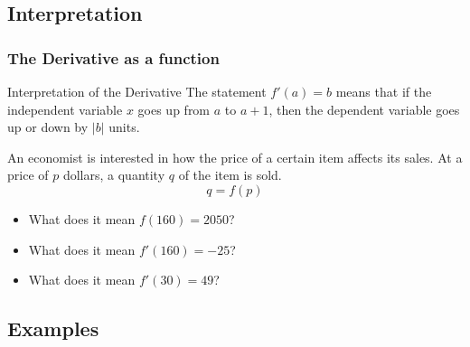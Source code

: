 \documentclass[9pt,xcolor=x11names,compress]{beamer}
\begin{document}
\subsection{Interpretation}
\begin{frame}\frametitle{The Derivative as a function}
\begin{block}{Interpretation of the Derivative}
The statement $f'(a)=b$ means that if the independent variable $x$ goes up from $a$ to $a+1$, then the dependent variable goes up or down by $\lvert b\rvert$ units.
\end{block}
\pause
\begin{example}
	An economist is interested in how the price of a certain item affects its sales.  At a price of $p$ dollars, a quantity $q$ of the item is sold.
	\begin{equation*}
		q=f(p)
	\end{equation*}
	\begin{itemize}
		\item What does it mean $f(160)=2050$?

		\item What does it mean $f'(160)=-25$?

		\item What does it mean $f'(30)=49$?

	\end{itemize}
\end{example}
\end{frame}

\subsection{Examples}
\end{document}
